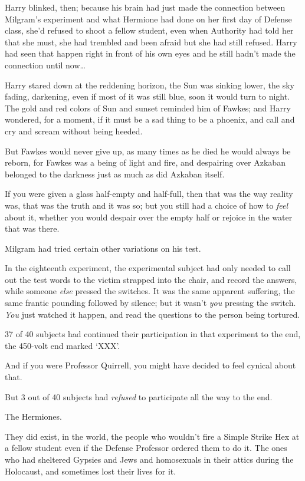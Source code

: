 Harry blinked, then; because his brain had just made the connection between Milgram's experiment and what Hermione had done on her first day of Defense class, she'd refused to shoot a fellow student, even when Authority had told her that she must, she had trembled and been afraid but she had still refused. Harry had seen that happen right in front of his own eyes and he still hadn't made the connection until now{\ldots}

Harry stared down at the reddening horizon, the Sun was sinking lower, the sky fading, darkening, even if most of it was still blue, soon it would turn to night. The gold and red colors of Sun and sunset reminded him of Fawkes; and Harry wondered, for a moment, if it must be a sad thing to be a phoenix, and call and cry and scream without being heeded.

But Fawkes would never give up, as many times as he died he would always be reborn, for Fawkes was a being of light and fire, and despairing over Azkaban belonged to the darkness just as much as did Azkaban itself.

If you were given a glass half-empty and half-full, then that was the way reality was, that was the truth and it was so; but you still had a choice of how to \emph{feel} about it, whether you would despair over the empty half or rejoice in the water that was there.

Milgram had tried certain other variations on his test.

In the eighteenth experiment, the experimental subject had only needed to call out the test words to the victim strapped into the chair, and record the answers, while someone \emph{else} pressed the switches. It was the same apparent suffering, the same frantic pounding followed by silence; but it wasn't \emph{you} pressing the switch. \emph{You} just watched it happen, and read the questions to the person being tortured.

37 of 40 subjects had continued their participation in that experiment to the end, the 450-volt end marked `XXX'.

And if you were Professor Quirrell, you might have decided to feel cynical about that.

But 3 out of 40 subjects had \emph{refused} to participate all the way to the end.

The Hermiones.

They did exist, in the world, the people who wouldn't fire a Simple Strike Hex at a fellow student even if the Defense Professor ordered them to do it. The ones who had sheltered Gypsies and Jews and homosexuals in their attics during the Holocaust, and sometimes lost their lives for it.

